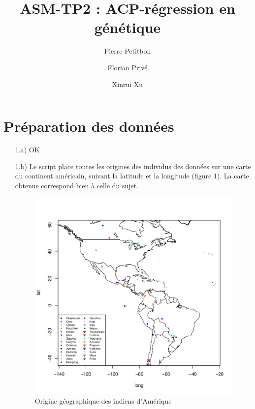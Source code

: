 \documentclass[a4paper, 12pt]{article}
\title{ASM-TP2 : ACP-régression en génétique}
\author{Pierre Petitbon \and Florian Privé \and Xinrui Xu}
\date{}
\begin{document}
\maketitle

\section{Préparation des données}

\begin{enumerate}
\setlength{\itemsep}{20pt}

\item[1.a)] 
	OK

\item[1.b)]
Le script place toutes les origines des individus des données sur une carte du continent américain, suivant la latitude et la longitude (figure 1). La carte obtenue correspond bien à celle du sujet. 

\begin{figure}[!h]
\begin{center}
\includegraphics[scale=1]{map.pdf}
\caption{Origine géographique des indiens d'Amérique}
\end{center}
\end{figure}

\end{enumerate}
\end{document}
